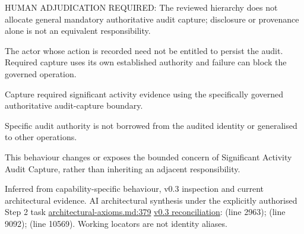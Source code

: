 HUMAN ADJUDICATION REQUIRED: The reviewed hierarchy does not allocate general mandatory authoritative audit capture; disclosure or provenance alone is not an equivalent responsibility.



The actor whose action is recorded need not be entitled to persist the audit. Required capture uses its own established authority and failure can block the governed operation.



Capture required significant activity evidence using the specifically governed authoritative audit-capture boundary.



Specific audit authority is not borrowed from the audited identity or generalised to other operations.



This behaviour changes or exposes the bounded concern of Significant Activity Audit Capture, rather than inheriting an adjacent responsibility.


Inferred from capability-specific behaviour, v0.3 inspection and current architectural evidence. AI architectural synthesis under the explicitly authorised Step 2 task \hyperref[evidence:27549d51551beae6]{architectural-axioms.md:379}
\hyperref[model:reconciliation]{v0.3 reconciliation}: \texttt{} (line 2963); \texttt{} (line 9092); \texttt{} (line 10569). Working locators are not identity aliases.
